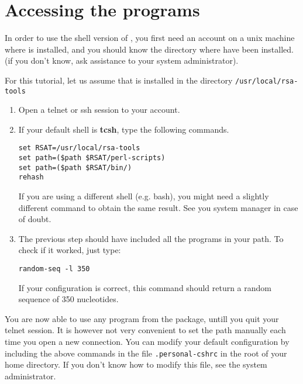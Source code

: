 
\section{Accessing the programs}

In order to use the shell version of \RSAT, you first need an account
on a unix machine where \RSAT is installed, and you should know the
directory where \RSAT have been installed. (if you don't know, ask
assistance to your system administrator).

For this tutorial, let us assume that \RSAT is installed in the
directory \texttt{/usr/local/rsa-tools}

\begin{enumerate}

\item Open a telnet or ssh session to your account.

\item If your default shell is \textbf{tcsh}, type the following
commands.

\begin{verbatim}
set RSAT=/usr/local/rsa-tools
set path=($path $RSAT/perl-scripts)
set path=($path $RSAT/bin/)
rehash
\end{verbatim}

If you are using a different shell (e.g. bash), you might need a
slightly different command to obtain the same result. See you system
manager in case of doubt.

\item The previous step should have included all the \RSAT programs in
your path.  To check if it worked, just type:

\begin{verbatim}
random-seq -l 350
\end{verbatim}

If your configuration is correct, this command should return a random
sequence of 350 nucleotides.

\end{enumerate}

You are now able to use any program from the \RSAT package, untill you
quit your telnet session. It is however not very convenient to set the
path manually each time you open a new connection. You can modify your
default configuration by including the above commands in the file
\texttt{.personal-cshrc} in the root of your home directory. If you
don't know how to modify this file, see the system administrator.
